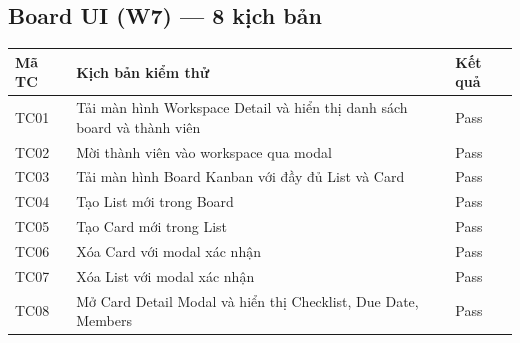 \subsection*{Board UI (W7) — 8 kịch bản}

\begin{table}[H]
\centering
\begin{tabularx}{\textwidth}{|l|X|l|}
\hline
\rowcolor{gray!20}
\textbf{Mã TC} & \textbf{Kịch bản kiểm thử} & \textbf{Kết quả} \\
\hline
TC01 & Tải màn hình Workspace Detail và hiển thị danh sách board và thành viên & Pass \\
\hline
TC02 & Mời thành viên vào workspace qua modal & Pass \\
\hline
TC03 & Tải màn hình Board Kanban với đầy đủ List và Card & Pass \\
\hline
TC04 & Tạo List mới trong Board & Pass \\
\hline
TC05 & Tạo Card mới trong List & Pass \\
\hline
TC06 & Xóa Card với modal xác nhận & Pass \\
\hline
TC07 & Xóa List với modal xác nhận & Pass \\
\hline
TC08 & Mở Card Detail Modal và hiển thị Checklist, Due Date, Members & Pass \\
\hline
\end{tabularx}
\end{table}

\clearpage
